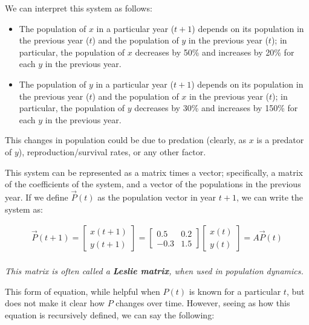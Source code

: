 \documentclass[12pt]{article}
\begin{document}
{We can interpret this system as follows:

\begin{itemize}
    \item The population of $x$ in a particular year ($t+1$) depends on its population in the previous year ($t$) and the population of $y$ in the previous year ($t$); in particular, the population of $x$ decreases by 50\% and increases by 20\% for each $y$ in the previous year.
    \item The population of $y$ in a particular year ($t+1$) depends on its population in the previous year ($t$) and the population of $x$ in the previous year ($t$); in particular, the population of $y$ decreases by 30\% and increases by 150\% for each $y$ in the previous year.
\end{itemize}

This changes in population could be due to predation (clearly, as $x$ is a predator of $y$), reproduction/survival rates, or any other factor.

This system can be represented as a matrix times a vector; specifically, a matrix of the coefficients of the system, and a vector of the populations in the previous year. If we define $\vec{P}(t)$ as the population vector in year $t+1$, we can write the system as:

\begin{equation}
    \begin{split}
        \vec{P}(t+1) = \begin{bmatrix}
            x(t+1)\\
            y(t+1)
        \end{bmatrix} = \begin{bmatrix}
            0.5 & 0.2\\
            -0.3 & 1.5
        \end{bmatrix}\begin{bmatrix}
            x(t)\\
            y(t)
        \end{bmatrix} = A\vec{P}(t)\\
    \end{split}
\end{equation}

\textit{This matrix is often called a \textbf{Leslie matrix}, when used in population dynamics.}

This form of equation, while helpful when $P(t)$ is known for a particular $t$, but does not make it clear how $P$ changes over time. However, seeing as how this equation is recursively defined, we can say the following: 

}
\end{document}

